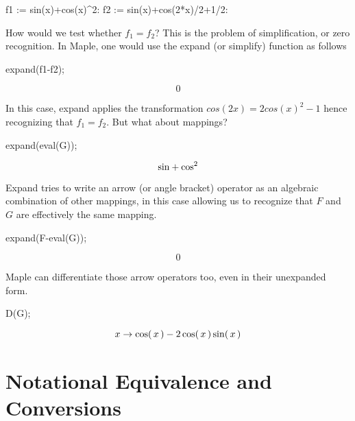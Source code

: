 \documentclass[11pt,dvips]{mtn}
\begin{document}
\begin{mapleinput}
f1 := sin(x)+cos(x)^2:
f2 := sin(x)+cos(2*x)/2+1/2:
\end{mapleinput}

How would we test whether $f_1 = f_2$?  This is the problem of
simplification, or zero recognition.
In Maple, one would use the expand (or simplify) function as follows

\begin{mapleinput}
expand(f1-f2);
\end{mapleinput}
\begin{maplelatex}
\[
0
\]
\end{maplelatex}

In this case, expand applies the transformation $cos(2 x) = 2 cos(x)^2 - 1$
hence recognizing that $f_1 = f_2$.
But what about mappings?

\begin{mapleinput}
expand(eval(G));
\end{mapleinput}
\begin{maplelatex}
\[
{\rm sin} + {\rm cos}^{2}
\]
\end{maplelatex}

Expand tries to write an arrow (or angle bracket)
operator as an algebraic combination of other mappings, in this case
allowing us to recognize that $F$ and $G$ are effectively
the same mapping.

\begin{mapleinput}
expand(F-eval(G));
\end{mapleinput}
\begin{maplelatex}
\[
0
\]
\end{maplelatex}

Maple can differentiate those arrow operators too, even
in their unexpanded form.

\begin{mapleinput}
D(G);
\end{mapleinput}
\begin{maplettyout}
\end{maplettyout}
\begin{maplelatex}
\[
{x} \rightarrow {\rm cos}(\,{x}\,) - 2\,{\rm cos}(\,{x}\,)\,{\rm 
sin}(\,{x}\,)
\]
\end{maplelatex}

\section{Notational Equivalence and Conversions}
\end{document}
